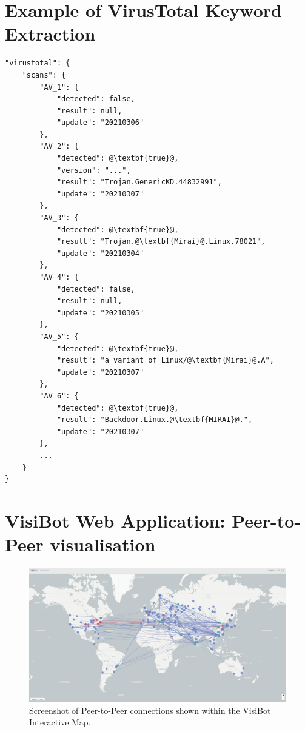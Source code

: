 \begin{appendices}
\section{Example of VirusTotal Keyword Extraction}
\label{appendix_a5}
\begin{lstlisting}[escapechar=@, caption={Example of keyword extraction from VirusTotal AV scan results. Positive scans and extracted keywords are highlighted in \textbf{bold}. This example illustrates the extraction of the top-most occurring keyword \textbf{mirai} for the given malware sample.}]
"virustotal": {
    "scans": {
        "AV_1": {
            "detected": false,
            "result": null,
            "update": "20210306"
        },
        "AV_2": {
            "detected": @\textbf{true}@,
            "version": "...",
            "result": "Trojan.GenericKD.44832991",
            "update": "20210307"
        },
        "AV_3": {
            "detected": @\textbf{true}@,
            "result": "Trojan.@\textbf{Mirai}@.Linux.78021",
            "update": "20210304"
        },
        "AV_4": {
            "detected": false,
            "result": null,
            "update": "20210305"
        },
        "AV_5": {
            "detected": @\textbf{true}@,
            "result": "a variant of Linux/@\textbf{Mirai}@.A",
            "update": "20210307"
        },
        "AV_6": {
            "detected": @\textbf{true}@,
            "result": "Backdoor.Linux.@\textbf{MIRAI}@.",
            "update": "20210307"
        },
        ...
    }
}
\end{lstlisting}

\newpage

\section{VisiBot Web Application: Peer-to-Peer visualisation}
\label{appendix_a6}
\begin{figure}[!htb]
    \centering
    \includegraphics[width=1.0\linewidth]{images/visibot_screenshot_connections.png}
    \caption{Screenshot of Peer-to-Peer connections shown within the VisiBot Interactive Map.}
    \label{fig:visibot_screenshot_connections} 
\end{figure}




\end{appendices}
